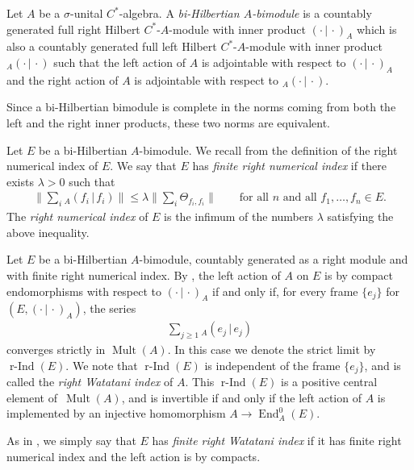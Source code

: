 \documentclass[10pt,a4paper]{amsart}
\numberwithin{equation}{section}
\DeclareMathOperator{\End}{End} %
\DeclareMathOperator{\Mult}{Mult} %
\newcommand{\rInd}{\operatorname{\mbox{$r$-$\operatorname{Ind}$}}}
\begin{document}
\begin{defn} \label{defn:bimod} Let $A$ be a $\sigma$-unital $C^*$-algebra. A \emph{bi-Hilbertian $A$-bimodule} is a countably generated full right Hilbert $C^*$-$A$-module with inner product $(\cdot \,|\, \cdot)_A$ which is also a countably generated full left Hilbert $C^*$-$A$-module with inner product ${_A(\cdot \,|\, \cdot)}$ such that the left action of $A$ is adjointable with respect to $(\cdot \,|\, \cdot)_A$ and the right action of $A$ is adjointable with respect to ${_A(\cdot \,|\, \cdot)}$.
\end{defn}

Since a bi-Hilbertian bimodule is complete in the norms coming from both the left and the right inner products, these two norms are equivalent.

Let $E$ be a bi-Hilbertian $A$-bimodule. We recall from \cite[Def\/inition~2.8]{KajPinWat} the def\/inition of the right numerical index of $E$. We say that $E$ has \emph{finite right numerical index} if there exists $\lambda > 0$ such that
\begin{gather*}\textstyle
\big\|\sum_i {_A(f_i \,|\, f_i)}\big\| \le \lambda \big\|\sum_i \Theta_{f_i, f_i}\big\|
 \qquad\text{for all $n$ and all $f_1, \dots, f_n \in E$.}
\end{gather*}
The \emph{right numerical index} of $E$ is the inf\/imum of the numbers $\lambda$ satisfying the above inequality.

Let $E$ be a bi-Hilbertian $A$-bimodule, countably generated as a right module and with f\/inite right numerical index. By \cite[Corollaries 2.24~and~2.28]{KajPinWat}, the left action of $A$ on $E$ is by compact endomorphisms with respect to $(\cdot \,|\, \cdot)_A$ if and only if, for every frame $\{e_j\}$ for $(E, (\cdot \,|\, \cdot)_A)$, the series
\begin{gather*}%
\sum_{j\geq 1}{}_A(e_j \,|\, e_j)
\end{gather*}
converges strictly in $\Mult(A)$. In this case we denote the strict limit by $\rInd(E)$. We note that $\rInd(E)$ is independent of the frame $\{e_j\}$, and is called the \emph{right Watatani index} of $A$. This $\rInd(E)$ is a positive central element of~$\Mult(A)$, and is invertible if and only if the left action of $A$ is implemented by an injective homomorphism $A \to \End_A^0(E)$.

As in \cite{KajPinWat}, we simply say that $E$ has \emph{finite right Watatani index} if it has f\/inite right numerical index and the left action is by compacts.
\end{document}
